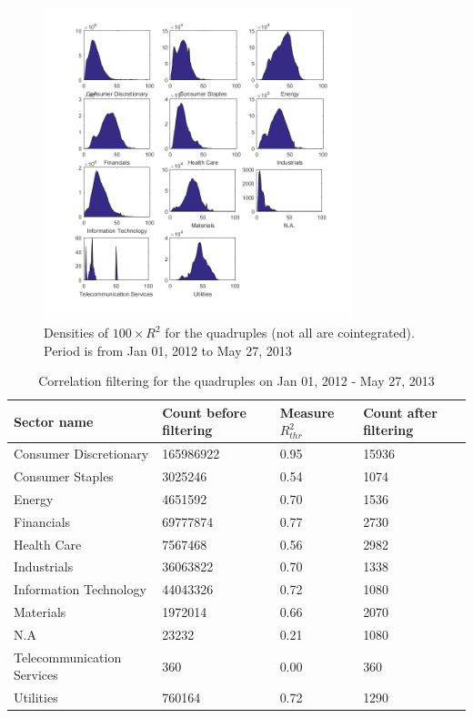\documentclass[11pt,a4,twosided,singlespacing,titlepagenumber=on]{scrreprt}
\numberwithin{equation}{chapter} %
\theoremstyle{remark}
\begin{document}
\begin{figure}[H]
\centering
\includegraphics[width = 0.8\textwidth]{R2_ret_Quads_Jan_1_2012_Mar_27_2013}
\caption{Densities of $100 \times R^2$ for the quadruples (not all are cointegrated). Period is from Jan 01, 2012 to May 27, 2013}
\label{dist_100_r2_quad}
\end{figure}

\begin{table}[H]
\centering
\begin{tabular}{llll}
\hline
\multicolumn{1}{|l|}{Sector name}     & \multicolumn{1}{|l|}{Count before filtering} & \multicolumn{1}{|l|}{Measure $R_{thr}^2$} & \multicolumn{1}{l|}{Count after filtering} \\ \hline
Consumer Discretionary						 &  165986922 & 0.95 & 15936 \\
Consumer Staples                   &  3025246 & 0.54 & 1074\\
Energy                             &  4651592 & 0.70 & 1536\\
Financials                         &  69777874 & 0.77 & 2730\\
Health Care                        &  7567468 & 0.56 & 2982\\
Industrials                        &  36063822 & 0.70 & 1338\\
Information Technology             & 44043326 & 0.72 & 1080\\
Materials                          & 1972014 & 0.66 & 2070\\
N.A                                & 23232 & 0.21 & 1080\\
Telecommunication Services         & 360 & 0.00 & 360\\
Utilities                          & 760164 & 0.72 & 1290\\
\hline
\end{tabular}
\caption{Correlation filtering for the quadruples on Jan 01, 2012 - May 27, 2013}
\label{corr_quad}
\end{table}
\end{document}
